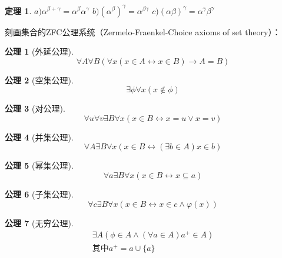 \documentclass{article}
\newtheorem{Thm}{定理}
\newtheorem{Ax}{公理}
\begin{document}
\begin{CJK*}{UTF8}{gbsn}
\begin{Thm}
  $a)\alpha^{\beta + \gamma}=\alpha^\beta\alpha^\gamma$ $b)(\alpha^\beta)^\gamma = \alpha^{\beta\gamma}$ $c)(\alpha\beta)^\gamma = \alpha^\gamma\beta^\gamma$
\end{Thm}
刻画集合的ZFC公理系统（Zermelo-Fraenkel-Choice axioms of set theory）：
  \begin{Ax}[外延公理]
    \begin{equation*}
      \forall A \forall B (\forall x (x \in A \leftrightarrow x\in B)\rightarrow A = B)
    \end{equation*}
  \end{Ax}   
  \begin{Ax}[空集公理]
    \begin{equation*}
      \exists \phi \forall x (x \notin \phi)
    \end{equation*}
  \end{Ax}
  \begin{Ax}[对公理]
    \begin{equation*}
      \forall u \forall v \exists B \forall x (x \in B \leftrightarrow x = u \lor x = v)
    \end{equation*}
  \end{Ax}
  \begin{Ax}[并集公理]
    \begin{equation*}
     \forall A \exists B \forall x (x \in B \leftrightarrow (\exists b \in A) x \in b)
    \end{equation*}
  \end{Ax}
    \begin{Ax}[幂集公理]
    \begin{equation*}
      \forall a \exists B \forall x ( x \in B \leftrightarrow x \subseteq a)
    \end{equation*}
  \end{Ax}
  \begin{Ax}[子集公理]
    \begin{equation*}
      \forall c \exists B \forall x (x \in B \leftrightarrow x \in c \land \varphi(x))
    \end{equation*}
  \end{Ax}
  \begin{Ax}[无穷公理]
    \begin{equation*}
      \begin{split}
      \exists A ( \phi \in A \land (\forall a \in A) a^+ \in A)\\
      \text{其中} a^+ = a \cup \{a\}
      \end{split}
    \end{equation*}

\end{Ax}
\end{CJK*}
\end{document}
